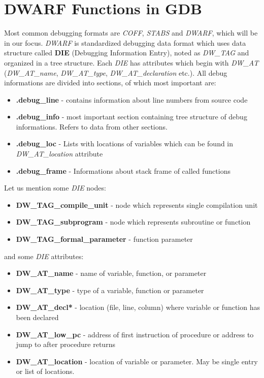\documentclass{report}
\begin{document}
\chapter *{DWARF Functions in GDB}
	Most common debugging formats are \textit{COFF}, \textit{STABS} and \textit{DWARF}, which will be in our focus. \textit{DWARF} is standardized debugging data format which uses data structure called \textbf{DIE} (Debugging Information Entry), noted as \textit{DW\_TAG} and organized in a tree structure.  Each \textit{DIE} has attributes which begin with \textit{DW\_AT} (\textit{DW\_AT\_name}, \textit{DW\_AT\_type}, \textit{DW\_AT\_declaration} etc.). All debug informations are divided into sections, of which most important are:
	\begin{itemize}
		\item \textbf{.debug\_line} - contains information about line numbers from source code
		\item \textbf{.debug\_info} - most important section containing tree structure of debug informations. Refers to data from other sections.
		\item \textbf{.debug\_loc} - Lists with locations of variables which can be found in \textit{DW\_AT\_location} attribute
		\item \textbf{.debug\_frame} - Informations about stack frame of called functions
	\end{itemize}
	Let us mention some \textit{DIE} nodes:
	\begin{itemize}
		\item \textbf{DW\_TAG\_compile\_unit} - node which represents single compilation unit
		\item \textbf{DW\_TAG\_subprogram} - node which represents subroutine or function
		\item \textbf{DW\_TAG\_formal\_parameter} - function parameter
	\end{itemize}
	and some \textit{DIE} attributes:
	\begin{itemize}
		\item \textbf{DW\_AT\_name} - name of variable, function, or parameter
		\item \textbf{DW\_AT\_type} - type of a variable, function or parameter
		\item \textbf{DW\_AT\_decl*} - location (file, line, column) where variable or function has been declared
		\item \textbf{DW\_AT\_low\_pc} - address of first instruction of procedure or address to jump to after procedure returns
		\item \textbf{DW\_AT\_location} - location of variable or parameter. May be single entry or list of locations.
	\end{itemize}
\end{document}
